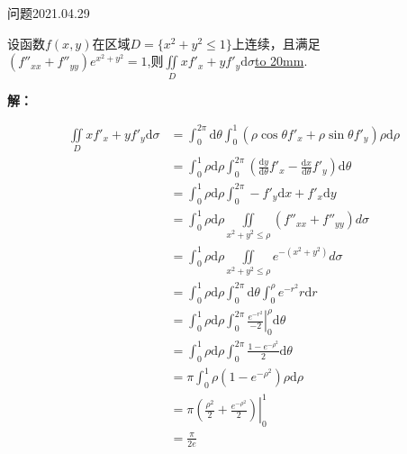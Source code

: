 \begin{mybox}{问题2021.04.29}
	
	\qquad 设函数$f(x,y)$在区域$D=\{x^2+y^2\le 1 \}$上连续，且满足\\
	$(f''_{xx}+f''_{yy})e^{x^2+y^2}=1$,则$\iint \limits_D xf'_{x}+yf'_{y}\mathrm{d}\sigma$\underline{\hbox to 20mm{}}.
\end{mybox}
\noindent
\textbf{解：}

\begin{align*}
\iint\limits_{D} xf'_{x}+yf'_{y}\mathrm{d}\sigma &=\int_{0}^{2\pi} \mathrm{d}\theta \int_{0}^{1}(\rho\cos \theta f'_{x}+\rho\sin \theta f'_{y})\rho \mathrm{d}\rho\\
&=\int_{0}^{1} \rho\mathrm{d}\rho \int_{0}^{2\pi} (\frac{\mathrm{d} y}{\mathrm{d} \theta}f'_{x}-\frac{\mathrm{d} x}{\mathrm{d} \theta}f'_{y})\mathrm{d}\theta\\
&=\int_{0}^{1}\rho\mathrm{d}\rho\int_{0}^{2\pi}-f'_{y}\mathrm{d}x+f'_{x}\mathrm{d}y\\
&=\int_{0}^{1}\rho\mathrm{d}\rho \iint\limits_{x^2+y^2\le \rho} (f''_{xx}+f''_{yy})d\sigma\\
&=\int_{0}^{1}\rho\mathrm{d}\rho \iint\limits_{x^2+y^2\le \rho} e^{-(x^2+y^2)}d\sigma\\
&=\int_{0}^{1}\rho \mathrm{d}\rho \int_{0}^{2\pi}\mathrm{d} \theta \int_{0}^{\rho} e^{-r^2} r\mathrm{d}r\\
&=\int_{0}^{1}\rho \mathrm{d}\rho \int_{0}^{2\pi} \left. \frac{e^{-r^2}}{-2} \right|_{0}^{\rho} \mathrm{d} \theta\\
&=\int_{0}^{1} \rho \mathrm{d}\rho \int_{0}^{2\pi}\frac{1-e^{-\rho^2}}{2}\mathrm{d}\theta \\
&=\pi\int_{0}^{1}\rho (1-e^{-\rho^2})\rho \mathrm{d}\rho\\
&=\left.\pi(\frac{\rho^2}{2}+\frac{e^{-\rho^2}}{2})\right|_{0}^{1}\\
&=\frac{\pi}{2e}
\end{align*}